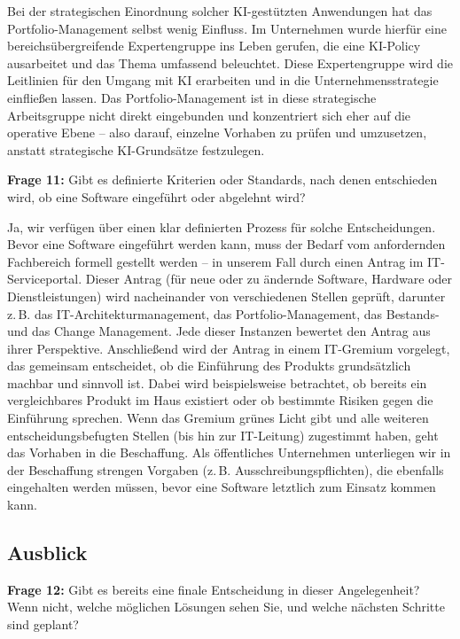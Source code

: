\documentclass[
    12pt, 
    a4paper,
    ]{scrartcl} %
\begin{document}
Bei der strategischen Einordnung solcher KI-gestützten Anwendungen hat das Portfolio-Management selbst wenig Einfluss. Im Unternehmen wurde hierfür eine bereichsübergreifende Expertengruppe ins Leben gerufen, die eine KI-Policy ausarbeitet und das Thema umfassend beleuchtet. Diese Expertengruppe wird die Leitlinien für den Umgang mit KI erarbeiten und in die Unternehmensstrategie einfließen lassen. Das Portfolio-Management ist in diese strategische Arbeitsgruppe nicht direkt eingebunden und konzentriert sich eher auf die operative Ebene – also darauf, einzelne Vorhaben zu prüfen und umzusetzen, anstatt strategische KI-Grundsätze festzulegen.  

\textbf{Frage 11:} Gibt es definierte Kriterien oder Standards, nach denen entschieden wird, ob eine Software eingeführt oder abgelehnt wird?  

Ja, wir verfügen über einen klar definierten Prozess für solche Entscheidungen. Bevor eine Software eingeführt werden kann, muss der Bedarf vom anfordernden Fachbereich formell gestellt werden – in unserem Fall durch einen Antrag im IT-Serviceportal. Dieser Antrag (für neue oder zu ändernde Software, Hardware oder Dienstleistungen) wird nacheinander von verschiedenen Stellen geprüft, darunter z.\,B. das IT-Architekturmanagement, das Portfolio-Management, das Bestands- und das Change Management. Jede dieser Instanzen bewertet den Antrag aus ihrer Perspektive. Anschließend wird der Antrag in einem IT-Gremium vorgelegt, das gemeinsam entscheidet, ob die Einführung des Produkts grundsätzlich machbar und sinnvoll ist. Dabei wird beispielsweise betrachtet, ob bereits ein vergleichbares Produkt im Haus existiert oder ob bestimmte Risiken gegen die Einführung sprechen. Wenn das Gremium grünes Licht gibt und alle weiteren entscheidungsbefugten Stellen (bis hin zur IT-Leitung) zugestimmt haben, geht das Vorhaben in die Beschaffung. Als öffentliches Unternehmen unterliegen wir in der Beschaffung strengen Vorgaben (z.\,B. Ausschreibungspflichten), die ebenfalls eingehalten werden müssen, bevor eine Software letztlich zum Einsatz kommen kann.  

\subsection*{Ausblick}

\textbf{Frage 12:} Gibt es bereits eine finale Entscheidung in dieser Angelegenheit? Wenn nicht, welche möglichen Lösungen sehen Sie, und welche nächsten Schritte sind geplant?  
\end{document}
